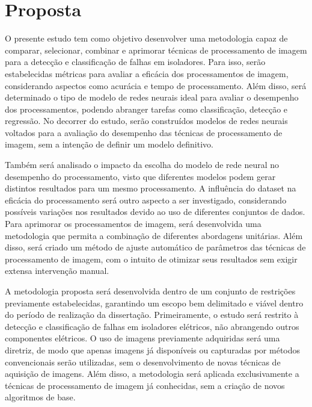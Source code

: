 \maketitle

\newpage

\section{Proposta}

O presente estudo tem como objetivo desenvolver uma metodologia capaz de comparar, selecionar, combinar e aprimorar técnicas de processamento de imagem para a detecção e classificação de falhas em isoladores. Para isso, serão estabelecidas métricas para avaliar a eficácia dos processamentos de imagem, considerando aspectos como acurácia e tempo de processamento. Além disso, será determinado o tipo de modelo de redes neurais ideal para avaliar o desempenho dos processamentos, podendo abranger tarefas como classificação, detecção e regressão. No decorrer do estudo, serão construídos modelos de redes neurais voltados para a avaliação do desempenho das técnicas de processamento de imagem, sem a intenção de definir um modelo definitivo.

Também será analisado o impacto da escolha do modelo de rede neural no desempenho do processamento, visto que diferentes modelos podem gerar distintos resultados para um mesmo processamento. A influência do dataset na eficácia do processamento será outro aspecto a ser investigado, considerando possíveis variações nos resultados devido ao uso de diferentes conjuntos de dados. Para aprimorar os processamentos de imagem, será desenvolvida uma metodologia que permita a combinação de diferentes abordagens unitárias. Além disso, será criado um método de ajuste automático de parâmetros das técnicas de processamento de imagem, com o intuito de otimizar seus resultados sem exigir extensa intervenção manual.

A metodologia proposta será desenvolvida dentro de um conjunto de restrições previamente estabelecidas, garantindo um escopo bem delimitado e viável dentro do período de realização da dissertação. Primeiramente, o estudo será restrito à detecção e classificação de falhas em isoladores elétricos, não abrangendo outros componentes elétricos. O uso de imagens previamente adquiridas será uma diretriz, de modo que apenas imagens já disponíveis ou capturadas por métodos convencionais serão utilizadas, sem o desenvolvimento de novas técnicas de aquisição de imagens. Além disso, a metodologia será aplicada exclusivamente a técnicas de processamento de imagem já conhecidas, sem a criação de novos algoritmos de base.

